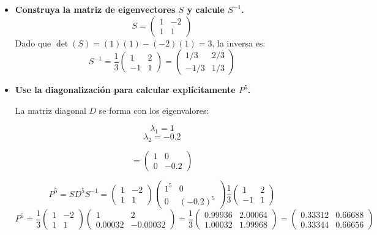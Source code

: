 \documentclass[10pt,a4paper]{book}
\begin{document}
\begin{itemize}
    \item[\textbf{c)}] \textbf{Construya la matriz de eigenvectores $S$ y calcule $S^{-1}$.} \\
    \[ S = \begin{pmatrix} 1 & -2 \\ 1 & 1 \end{pmatrix} \]
    Dado que $\det(S) = (1)(1) - (-2)(1) = 3$, la inversa es:
    \[ S^{-1} = \frac{1}{3} \begin{pmatrix} 1 & 2 \\ -1 & 1 \end{pmatrix} = \begin{pmatrix} 1/3 & 2/3 \\ -1/3 & 1/3 \end{pmatrix} \]

    \item[\textbf{d)}] \textbf{Use la diagonalización para calcular explícitamente $P^5$.} \\

    \vspace{0.2cm}

    La matriz diagonal $D$ se forma con los eigenvalores:

    \[
    \lambda_{1} = 1 
    \]
    \[
    \lambda_{2} = -0.2
    \]
    
    \[  = \begin{pmatrix} 1 & 0 \\ 0 & -0.2 \end{pmatrix} \]
    
    
    \[ P^5 = S D^5 S^{-1} = \begin{pmatrix} 1 & -2 \\ 1 & 1 \end{pmatrix} \begin{pmatrix} 1^5 & 0 \\ 0 & (-0.2)^5 \end{pmatrix} \frac{1}{3} \begin{pmatrix} 1 & 2 \\ -1 & 1 \end{pmatrix} \]
    \[ P^5 = \frac{1}{3} \begin{pmatrix} 1 & -2 \\ 1 & 1 \end{pmatrix} \begin{pmatrix} 1 & 2 \\ 0.00032 & -0.00032 \end{pmatrix} = \frac{1}{3} \begin{pmatrix} 0.99936 & 2.00064 \\ 1.00032 & 1.99968 \end{pmatrix} = \begin{pmatrix} 0.33312 & 0.66688 \\ 0.33344 & 0.66656 \end{pmatrix} \]


\end{itemize}
\end{document}

